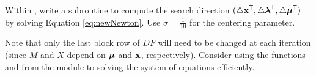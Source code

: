 \begin{problem} %
Within , write a subroutine to compute the search direction $(\triangle \mathbf{x}^{\mathsf T} , \triangle \boldsymbol{\lambda}^{\mathsf T} , \triangle \boldsymbol{\mu}^{\mathsf T} )$ by solving Equation \ref{eq:newNewton}.
Use $\sigma = \frac{1}{10}$ for the centering parameter.

Note that only the last block row of $DF$ will need to be changed at each iteration (since $M$ and $X$ depend on $\boldsymbol{\mu}$ and $\mathbf{x}$, respectively).
Consider using the functions  and  from the  module to solving the system of equations efficiently.
\end{problem}

